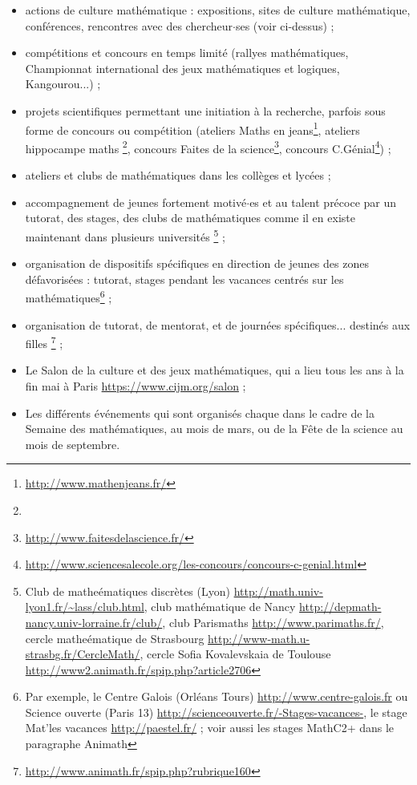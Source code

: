 \begin{itemize}
\item actions de culture math\'ematique : expositions, sites de culture math\'ema\-ti\-que, conf\'erences,
 rencontres avec des chercheur$\cdot$ses (voir ci-dessus) ;
\item comp\'etitions et concours en temps limit\'e (rallyes math\'ematiques, Championnat international
des jeux math\'ematiques et logiques, Kangourou...) ;
\item projets scientifiques permettant une initiation \`a la recherche, parfois sous forme de concours
ou comp\'etition (ateliers Maths en jeans\footnote{\url{http://www.mathenjeans.fr/}}, ateliers
 hippocampe maths \footnote{}, concours
Faites de la science\footnote{\url{http://www.faitesdelascience.fr/}}, concours C.G\'enial\footnote{\url{http://www.sciencesalecole.org/les-concours/concours-c-genial.html}}) ;
\item ateliers et clubs de math\'ematiques dans les coll\`eges et lyc\'ees ;
\item accompagnement de jeunes fortement motiv\'e$\cdot$es et au talent pr\'ecoce par un tutorat, des stages,
des clubs de math\'ematiques comme il en existe maintenant dans plusieurs universit\'es \footnote{Club de mathe\'ematiques discr\`etes (Lyon) \url{http://math.univ-lyon1.fr/~lass/club.html}, club math\'ematique de Nancy \url{http://depmath-nancy.univ-lorraine.fr/club/}, club Parismaths \url{http://www.parimaths.fr/}, cercle mathe\'ematique de Strasbourg \url{http://www-math.u-strasbg.fr/CercleMath/}, cercle Sofia Kovalevskaia de Toulouse \url{http://www2.animath.fr/spip.php?article2706}} ;
\item organisation de dispositifs sp\'ecifiques en direction de jeunes des zones d\'efavoris\'ees :
tutorat, stages pendant les vacances centr\'es sur les math\'ema\-ti\-ques\footnote{Par exemple, le Centre Galois (Orl\'eans Tours) \url{http://www.centre-galois.fr} ou Science ouverte (Paris 13) \url{http://scienceouverte.fr/-Stages-vacances-}, le stage Mat'les vacances \url{http://paestel.fr/} ; voir aussi les stages MathC2+ dans le paragraphe Animath} ;
\item organisation de tutorat, de mentorat, et de journ\'ees sp\'ecifiques... destin\'es aux filles  \footnote{\url{http://www.animath.fr/spip.php?rubrique160}} ;
\item Le Salon de la culture et des jeux math\'ematiques, qui a lieu tous les ans \`a la fin mai \`a Paris \url{https://www.cijm.org/salon} ;
\item Les diff\'erents \'ev\'enements qui sont organis\'es chaque dans le cadre de la Semaine des math\'ematiques, au mois de mars, ou de la F\^ete de la science au mois de septembre.
\end{itemize}

